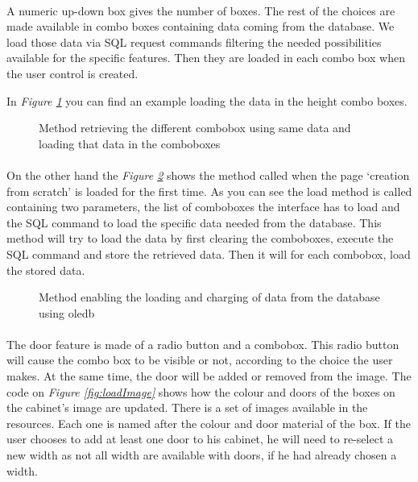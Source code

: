 \documentclass[12pt,oneside]{report}
\begin{document}
            \paragraph{}
            A numeric up-down box gives the number of boxes. The rest of the choices are made available in combo boxes containing data coming from the database. We load those data via SQL request commands filtering the needed possibilities available for the specific features. Then they are loaded in each combo box when the user control is created.
            
            In \textit{Figure \ref{fig:loaddataheight}} you can find an example loading the data in the height combo boxes. 
            \vspace{\baselineskip}
            \begin{figure}[h!]
                
                \caption{Method retrieving the different combobox using same data and loading that data in the comboboxes}
                \label{fig:loaddataheight}
            \end{figure} 
            
            \paragraph{}
            On the other hand the \textit{Figure \ref{fig:loaddata}} shows the method called when the page ‘creation from scratch’ is loaded for the first time. As you can see the load method is called containing two parameters, the list of comboboxes the interface has to load and the SQL command to load the specific data needed from the database. This method will try to load the data by first clearing the comboboxes, execute the SQL command and store the retrieved data. Then it will for each combobox, load the stored data.
            \vspace{\baselineskip}
            \newpage
            
            \begin{figure}[h!]
                
                \caption{Method enabling the loading and charging of data from the database using oledb}
                \label{fig:loaddata}
            \end{figure}

            \paragraph{}
            The door feature is made of a radio button and a combobox. This radio button will cause the combo box to be visible or not, according to the choice the user makes. At the same time, the door will be added or removed from the image. The code on \textit{Figure \ref{fig:loadImage}} shows how the colour and doors of the boxes on the cabinet's image are updated. There is a set of images available in the resources. Each one is named after the colour and door material of the box. If the user chooses to add at least one door to his cabinet, he will need to re-select a new width as not all width are available with doors, if he had already chosen a width.
            
\end{document}
